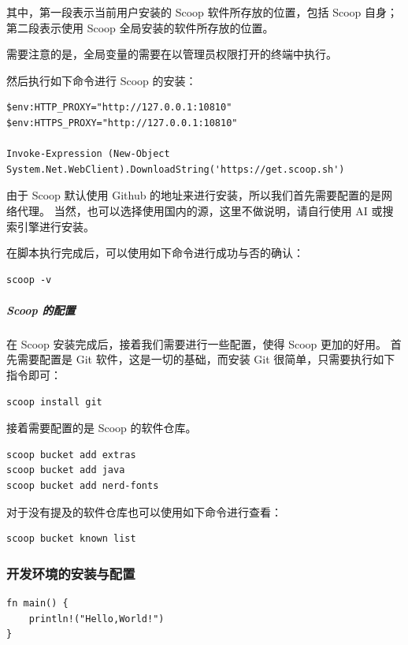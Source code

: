 其中，第一段表示当前用户安装的 Scoop 软件所存放的位置，包括 Scoop 自身；
第二段表示使用 Scoop 全局安装的软件所存放的位置。

需要注意的是，全局变量的需要在以管理员权限打开的终端中执行。

然后执行如下命令进行 Scoop 的安装：

\begin{verbatim}
$env:HTTP_PROXY="http://127.0.0.1:10810"
$env:HTTPS_PROXY="http://127.0.0.1:10810"

Invoke-Expression (New-Object System.Net.WebClient).DownloadString('https://get.scoop.sh')
\end{verbatim}

由于 Scoop 默认使用 Github 的地址来进行安装，所以我们首先需要配置的是网络代理。
当然，也可以选择使用国内的源，这里不做说明，请自行使用 AI 或搜索引擎进行安装。

在脚本执行完成后，可以使用如下命令进行成功与否的确认：

\begin{verbatim}
scoop -v
\end{verbatim}

\subparagraph{Scoop 的配置}

在 Scoop 安装完成后，接着我们需要进行一些配置，使得 Scoop 更加的好用。
首先需要配置是 Git 软件，这是一切的基础，而安装 Git 很简单，只需要执行如下指令即可：

\begin{verbatim}
scoop install git
\end{verbatim}

接着需要配置的是 Scoop 的软件仓库。

\begin{verbatim}
scoop bucket add extras
scoop bucket add java
scoop bucket add nerd-fonts
\end{verbatim}

对于没有提及的软件仓库也可以使用如下命令进行查看：

\begin{verbatim}
scoop bucket known list
\end{verbatim}

\subsubsection{开发环境的安装与配置}

\begin{verbatim}
fn main() {
    println!("Hello,World!")
}
\end{verbatim}